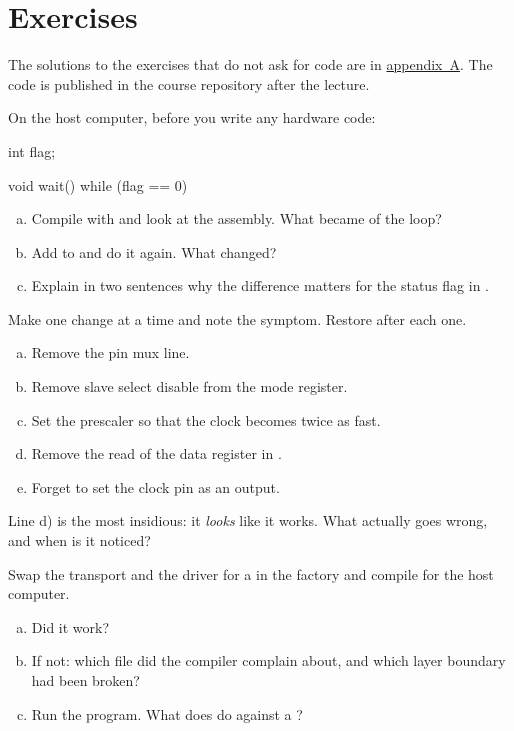 \section*{Exercises}

The solutions to the exercises that do not ask for code are in
\hyperref[ch:losningar]{appendix~A}. The code is published in the course repository after the
lecture.

\label{ex:12:1}
On the host computer, before you write any hardware code:
\begin{cppcode}
int flag{};

void wait()
{
    while (flag == 0)
    {
    }
}
\end{cppcode}
\begin{enumerate}[a)]
  \item Compile with  and look at the assembly. What became of the loop?
  \item Add  to  and do it again. What changed?
  \item Explain in two sentences why the difference matters for the status flag in
    .
\end{enumerate}

\label{ex:12:2}
Make one change at a time and note the symptom. Restore after each one.
\begin{enumerate}[a)]
  \item Remove the pin mux line.
  \item Remove slave select disable from the mode register.
  \item Set the prescaler so that the clock becomes twice as fast.
  \item Remove the read of the data register in .
  \item Forget to set the clock pin as an output.
\end{enumerate}
Line d) is the most insidious: it \emph{looks} like it works. What actually goes wrong, and when
is it noticed?

\label{ex:12:3}
Swap the transport and the driver for a  in the factory and compile for the host
computer.
\begin{enumerate}[a)]
  \item Did it work?
  \item If not: which file did the compiler complain about, and which layer boundary had been
    broken?
  \item Run the program. What does  do against a ?
\end{enumerate}


